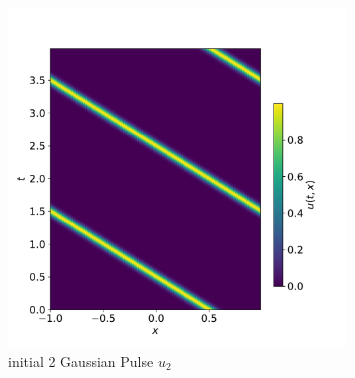 \documentclass[11pt]{article}
\begin{document}
\begin{figure}[!ht]
  \centering
  \includegraphics[width=0.8\textwidth]{1d_Wave_Solution2_u2.pdf}
  \caption{initial 2 Gaussian Pulse $u_2$}
\end{figure}
\pagebreak
\end{document}
